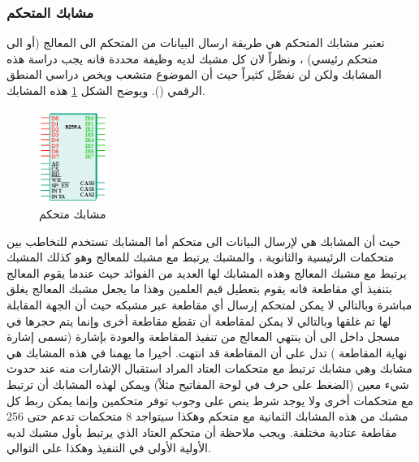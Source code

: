 \documentclass[document.tex]{subfiles}
\begin{document}
\subsubsection{مشابك المتحكم }
تعتبر مشابك المتحكم هي  طريقة ارسال البيانات من المتحكم الى المعالج (أو الى متحكم رئيسي) ، ونظراً لان كل مشبك لديه وظيفة محددة فانه يجب دراسة هذه المشابك ولكن لن نفصِّل كثيراً حيث أن الموضوع متشعب ويخص دراسي المنطق الرقمي (). ويوضح الشكل \ref{fig:pic_pins} هذه المشابك.

\begin{figure}
  \vspace{-20pt}
  \begin{center}
    \includegraphics[width=0.20\textwidth]{../img/pic_pins}
  \end{center}
  \vspace{-20pt}
  \caption{مشابك متحكم }
  \vspace{-10pt}
\label{fig:pic_pins} 
\end{figure}

حيث أن المشابك  هي لإرسال البيانات الى متحكم  أما المشابك  تستخدم للتخاطب بين متحكمات  الرئيسية والثانوية ، والمشبك  يرتبط مع مشبك للمعالج وهو  كذلك المشبك  يرتبط مع مشبك المعالج  وهذه المشابك لها العديد من الفوائد حيث عندما يقوم المعالج بتنفيذ أي مقاطعة فانه يقوم بتعطيل قيم العلمين  وهذا ما يجعل مشبك المعالج  يغلق مباشرة وبالتالي لا يمكن لمتحكم  إرسال أي مقاطعة عبر مشبكه  حيث أن الجهة المقابلة لها تم غلقها وبالتالي لا يمكن لمقاطعة أن تقطع مقاطعة أخرى وإنما يتم حجرها في مسجل داخل  الى أن ينتهي المعالج من تنفيذ المقاطعة والعودة بإشارة (تسمى إشارة نهاية المقاطعة ) تدل على أن المقاطعة قد انتهت. أخيرا ما يهمنا في هذه المشابك هي مشابك  وهي مشابك ترتبط مع متحكمات العتاد المراد استقبال الإشارات منه عند حدوث شيء معين (الضغط على حرف في لوحة المفاتيح مثلاً) ويمكن لهذه المشابك أن ترتبط مع متحكمات  أخرى ولا يوجد شرط ينص على وجوب توفر متحكمين  وإنما يمكن ربط كل مشبك من هذه المشابك الثمانية مع متحكم  وهكذا سيتواجد 8 متحكمات تدعم حتى 256 مقاطعة عتادية مختلفة. ويجب ملاحظة أن متحكم العتاد الذي يرتبط بأول مشبك  لديه الأولية الأولى في التنفيذ وهكذا على التوالي.\\
\end{document}

